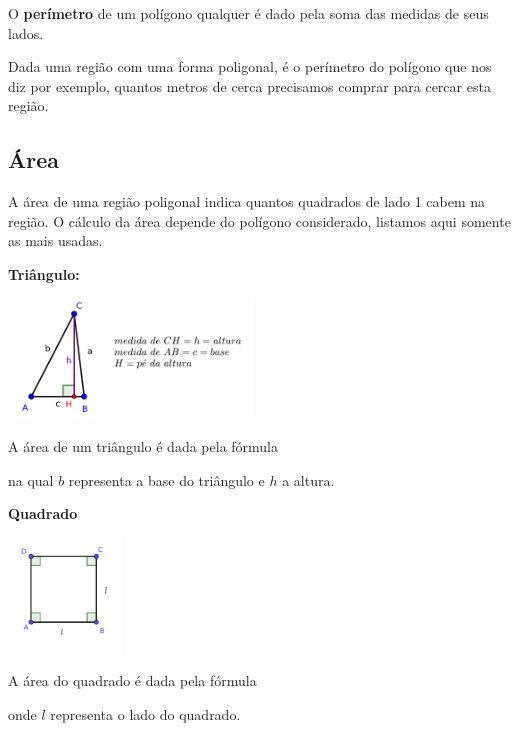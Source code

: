 \begin{obs}
  O \textbf{perímetro} de um polígono qualquer é dado pela soma das medidas de seus lados.
 \end{obs}


Dada uma região com uma forma poligonal, é o perímetro do polígono que nos diz por exemplo, quantos metros de cerca precisamos comprar para cercar esta região.

\subsection{Área}

A área de uma região poligonal indica quantos quadrados de lado 1 cabem na região. O cálculo da área depende do polígono considerado, listamos aqui somente as mais usadas.



\textbf{Triângulo:}
\begin{multicols}{2}

\includegraphics[width=6.5cm]{./cap_geometria/figs/triangulo}

A área de um triângulo é dada pela fórmula


na qual $b$ representa a base do triângulo e $h$ a altura.
\end{multicols}

\textbf{Quadrado}
\begin{multicols}{2}
\includegraphics[width=3cm]{./cap_geometria/figs/quadrado_L}

A área do quadrado é dada pela fórmula


onde $l$ representa o lado do quadrado.
\end{multicols}


